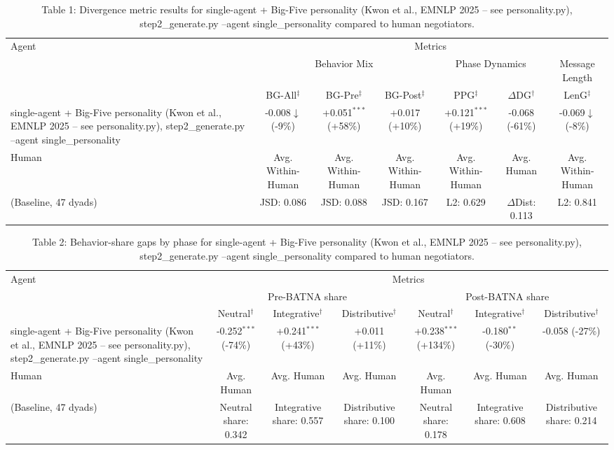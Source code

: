 \begin{table}[t]
\centering
\begin{tabular}{lcccccc}
\toprule
\multirow{3}{*}{Agent} & \multicolumn{6}{c}{Metrics} \\
\cmidrule(lr){2-7}
 & \multicolumn{3}{c}{Behavior Mix} & \multicolumn{2}{c}{Phase Dynamics} & \multicolumn{1}{c}{Message Length} \\
\cmidrule(lr){2-4} \cmidrule(lr){5-6} \cmidrule(lr){7-7}
 & BG-All$^\ddagger$ & BG-Pre$^\ddagger$ & BG-Post$^\ddagger$ & PPG$^\ddagger$ & $\Delta$DG$^\dagger$ & LenG$^\ddagger$ \\
\midrule
single-agent + Big-Five personality (Kwon et al., EMNLP 2025 -- see personality.py), step2_generate.py --agent single_personality & -0.008$\downarrow$ (-9\%) & +0.051$^{***}$ (+58\%) & +0.017 (+10\%) & +0.121$^{***}$ (+19\%) & -0.068 (-61\%) & -0.069$\downarrow$ (-8\%) \\
\midrule
Human & Avg. Within-Human & Avg. Within-Human & Avg. Within-Human & Avg. Within-Human & Avg. Human & Avg. Within-Human \\
(Baseline, 47 dyads) & JSD: 0.086 & JSD: 0.088 & JSD: 0.167 & L2: 0.629 & $\Delta$Dist: 0.113 & L2: 0.841 \\
\bottomrule
\end{tabular}
\caption{Table 1: Divergence metric results for single-agent + Big-Five personality (Kwon et al., EMNLP 2025 -- see personality.py), step2_generate.py --agent single_personality compared to human negotiators.}
\end{table}

\begin{table}[t]
\centering
\begin{tabular}{lcccccc}
\toprule
\multirow{3}{*}{Agent} & \multicolumn{6}{c}{Metrics} \\
\cmidrule(lr){2-7}
 & \multicolumn{3}{c}{Pre-BATNA share} & \multicolumn{3}{c}{Post-BATNA share} \\
\cmidrule(lr){2-4} \cmidrule(lr){5-7}
 & Neutral$^\dagger$ & Integrative$^\dagger$ & Distributive$^\dagger$ & Neutral$^\dagger$ & Integrative$^\dagger$ & Distributive$^\dagger$ \\
\midrule
single-agent + Big-Five personality (Kwon et al., EMNLP 2025 -- see personality.py), step2_generate.py --agent single_personality & -0.252$^{***}$ (-74\%) & +0.241$^{***}$ (+43\%) & +0.011 (+11\%) & +0.238$^{***}$ (+134\%) & -0.180$^{**}$ (-30\%) & -0.058 (-27\%) \\
\midrule
Human & Avg. Human & Avg. Human & Avg. Human & Avg. Human & Avg. Human & Avg. Human \\
(Baseline, 47 dyads) & Neutral share: 0.342 & Integrative share: 0.557 & Distributive share: 0.100 & Neutral share: 0.178 & Integrative share: 0.608 & Distributive share: 0.214 \\
\bottomrule
\end{tabular}
\caption{Table 2: Behavior-share gaps by phase for single-agent + Big-Five personality (Kwon et al., EMNLP 2025 -- see personality.py), step2_generate.py --agent single_personality compared to human negotiators.}
\end{table}
